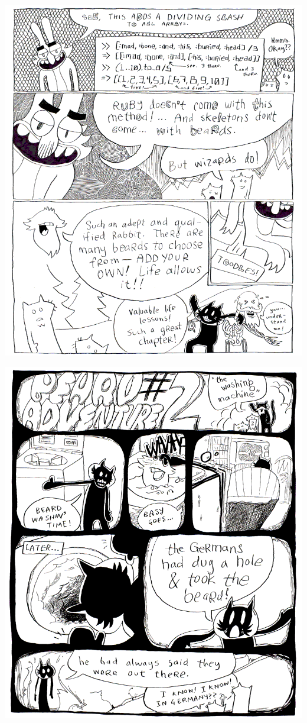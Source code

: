 \documentclass[10pt,twoside]{report}
\begin{document}
\vspace*{0.6cm} \includegraphics[width=1.0\textwidth]{cache/92.png}
\newpage

\vspace*{0.6cm} \includegraphics[width=1.0\textwidth]{cache/93.png}
\newpage
\end{document}
